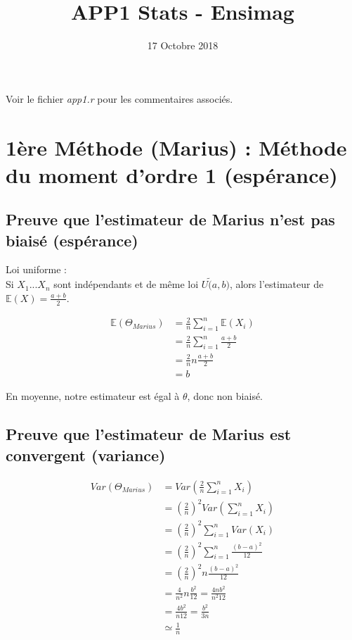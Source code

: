 \documentclass{article}
\title{APP1 Stats - Ensimag}
\author{}
\date{17 Octobre 2018}
\begin{document}
        
\maketitle

Voir le fichier \textit{app1.r} pour les commentaires associés.

\section{1ère Méthode (Marius) : Méthode du moment d'ordre 1 (espérance)}

\subsection{Preuve que l'estimateur de Marius n'est pas biaisé (espérance)}

Loi uniforme :\\

Si $X_1...X_n$ sont indépendants et de même loi $U\tilde (a,b)$, alors l'estimateur de $\mathbb{E}(X)=\frac{a+b}{2}$.

\begin{equation}
    \begin{aligned}
        \mathbb{E}(\Theta_{Marius})&=\frac{2}{n}\sum_{i=1}^n \mathbb{E}(X_i)\\
        &=\frac{2}{n}\sum_{i=1}^n \frac{a+b}{2}\\
        &=\frac{2}{n}n\frac{a+b}{2}\\
        &=b
    \end{aligned}
\end{equation}

En moyenne, notre estimateur est égal à $\theta$, donc non biaisé.

\subsection{Preuve que l'estimateur de Marius est convergent (variance)}

\begin{equation}
    \begin{aligned}
        Var(\Theta_{Marius})&=Var(\frac{2}{n}\sum_{i=1}^n X_i)\\
        &=(\frac{2}{n})^2Var(\sum_{i=1}^n X_i)\\
        &=(\frac{2}{n})^2\sum_{i=1}^n Var(X_i)\\
        &=(\frac{2}{n})^2\sum_{i=1}^n \frac{(b-a)^2}{12}\\
        &=(\frac{2}{n})^2n\frac{(b-a)^2}{12}\\
        &=\frac{4}{n^2}n\frac{b^2}{12}=\frac{4nb^2}{n^2 12}\\
        &=\frac{4b^2}{n 12}=\frac{b^2}{3n}\\
        &\simeq \frac{1}{n}
    \end{aligned}
\end{equation}
\end{document}
